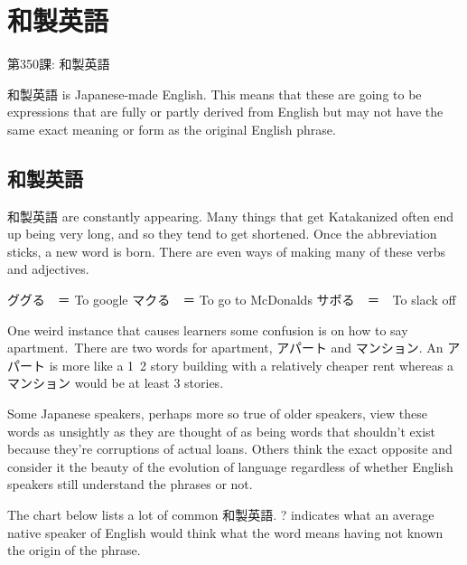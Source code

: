     
\chapter{和製英語}

\begin{center}
\begin{Large}
第350課: 和製英語 
\end{Large}
\end{center}
  和製英語 is Japanese-made English. This means that these are going to be expressions that are fully or partly derived from English but may not have the same exact meaning or form as the original English phrase.       
\section{和製英語}
 
\par{ 和製英語 are constantly appearing. Many things that get Katakanized often end up being very long, and so they tend to get shortened. Once the abbreviation sticks, a new word is born. There are even ways of making many of these verbs and adjectives. }

\par{ググる　＝ To google  マクる　＝ To go to McDonalds  サボる　＝　To slack off }

\par{ One weird instance that causes learners some confusion is on how to say apartment. There are two words for apartment, アパート and マンション. An アパート is more like a 1~2 story building with a relatively cheaper rent whereas a マンション would be at least 3 stories. }

\par{  Some Japanese speakers, perhaps more so true of older speakers, view these words as unsightly as they are thought of as being words that shouldn't exist because they're corruptions of actual loans. Others think the exact opposite and consider it the beauty of the evolution of language regardless of whether English speakers still understand the phrases or not. }

\par{ The chart below lists a lot of common 和製英語. ? indicates what an average native speaker of English would think what the word means having not known the origin of the phrase. }

